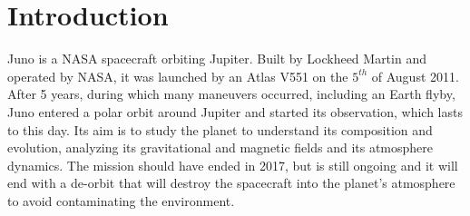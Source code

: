 \section{Introduction}
\label{sec:introduction}

Juno is a NASA spacecraft orbiting Jupiter. Built by Lockheed Martin and operated by NASA, it was launched by an Atlas V551 on the $5^{th}$ of August 2011. After 5 years, during which many maneuvers occurred, including an Earth flyby, Juno entered a polar orbit around Jupiter and started its observation, which lasts to this day. Its aim is to study the planet to understand its composition and evolution, analyzing its gravitational and magnetic fields and its atmosphere dynamics. The mission should have ended in 2017, but is still ongoing and it will end with a de-orbit that will destroy the spacecraft into the planet's atmosphere to avoid contaminating the environment. 